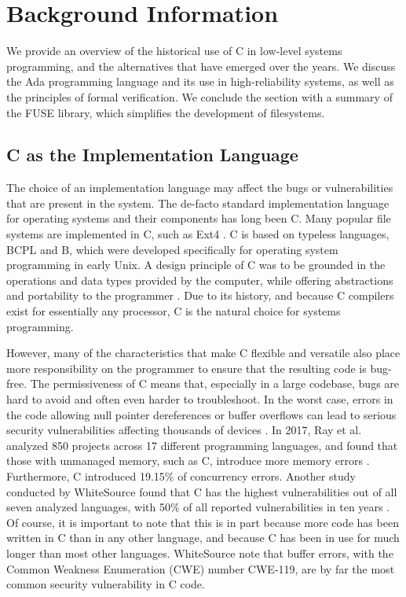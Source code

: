 \section{Background Information}
We provide an overview of the historical use of C in low-level systems programming, and the alternatives that have emerged over the years.
We discuss the Ada programming language and its use in high-reliability systems, as well as the principles of formal verification.
We conclude the section with a summary of the FUSE library, which simplifies the development of filesystems.

\subsection{C as the Implementation Language}
The choice of an implementation language may affect the bugs or vulnerabilities that are present in the system.
The de-facto standard implementation language for operating systems and their components has long been C.
Many popular file systems are implemented in C, such as Ext4 \cite{ext4code}.
C is based on typeless languages, BCPL and B, which were developed specifically for operating system programming in early Unix.
A design principle of C was to be grounded in the operations and data types provided by the computer, while offering abstractions and portability to the programmer \cite{ritchie1993}.
Due to its history, and because C compilers exist for essentially any processor, C is the natural choice for systems programming.

However, many of the characteristics that make C flexible and versatile also place more responsibility on the programmer to ensure that the resulting code is bug-free.
The permissiveness of C means that, especially in a large codebase, bugs are hard to avoid and often even harder to troubleshoot.
In the worst case, errors in the code allowing null pointer dereferences or buffer overflows can lead to serious security vulnerabilities affecting thousands of devices \cite{cert2001}.
In 2017, Ray et al. analyzed 850 projects across 17 different programming languages, and found that those with unmanaged memory, such as C, introduce more memory errors \cite{ray2017}.
Furthermore, C introduced 19.15\% of concurrency errors.
Another study conducted by WhiteSource found that C has the highest vulnerabilities out of all seven analyzed languages, with 50\% of all reported vulnerabilities in ten years \cite{whitesource2019}.
Of course, it is important to note that this is in part because more code has been written in C than in any other language, and because C has been in use for much longer than most other languages.
WhiteSource note that buffer errors, with the Common Weakness Enumeration (CWE) number CWE-119, are by far the most common security vulnerability in C code.

